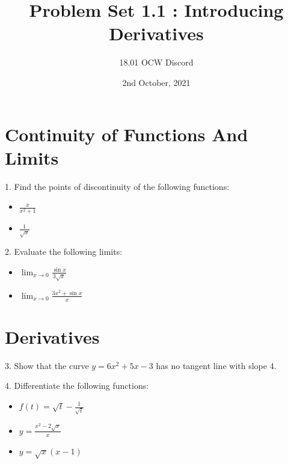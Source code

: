 \documentclass[a4paper]{article}
\title{Problem Set 1.1 : Introducing Derivatives}
\author{18.01 OCW Discord}
\date{2nd October, 2021}
\begin{document}
\maketitle

\section{Continuity of Functions And Limits}
\noindent
\vspace{2.5mm}

1. Find the points of discontinuity of the following functions:

\begin{itemize}
	\item $\frac{x}{x^{2}+1}$
	\item $\frac{1}{\sqrt{x}}$
\end{itemize}


\noindent
\vspace{2.5mm}

2. Evaluate the following limits:

\begin{itemize}
	\item $ \lim_{x \to 0} \frac{\sin x}{3 \sqrt{x} }$
	\item $\lim_{x \to 0} \frac{3x^{2}+ \sin x}{x}$
\end{itemize}

\section{Derivatives}

\noindent
\vspace{2.5mm}

3. Show that the curve $y = 6x^{2} +5x -3$ has no tangent line with slope 4.


\noindent
\vspace{2.5mm}

4. Differentiate the following functions:
\begin{itemize}
	\item $f(t)= \sqrt{t} - \frac{1}{\sqrt{t}}$
	\item $y = \frac{x^{2} - 2\sqrt{x}}{x}$
	\item $y = \sqrt{x}(x-1)$
\end{itemize}
\end{document}
